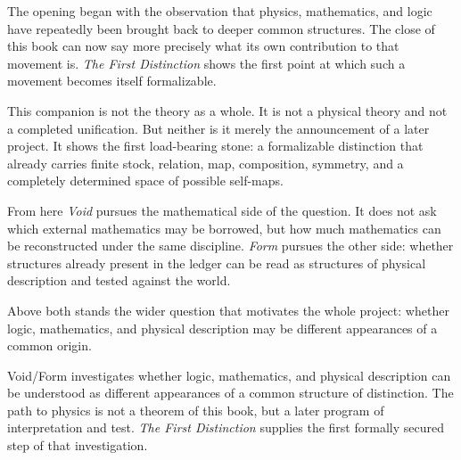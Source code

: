 \documentclass[11pt,a4paper]{book}
\begin{document}
The opening began with the observation that physics, mathematics, and logic
have repeatedly been brought back to deeper common structures. The close of
this book can now say more precisely what its own contribution to that
movement is. \textit{The First Distinction} shows the first point at which
such a movement becomes itself formalizable.

This companion is not the theory as a whole. It is not a physical theory and
not a completed unification. But neither is it merely the announcement of a
later project. It shows the first load-bearing stone: a formalizable
distinction that already carries finite stock, relation, map, composition,
symmetry, and a completely determined space of possible self-maps.

From here \textit{Void} pursues the mathematical side of the question. It
does not ask which external mathematics may be borrowed, but how much
mathematics can be reconstructed under the same discipline. \textit{Form}
pursues the other side: whether structures already present in the ledger can
be read as structures of physical description and tested against the world.

Above both stands the wider question that motivates the whole project:
whether logic, mathematics, and physical description may be different
appearances of a common origin.

\begin{center}
\end{center}

Void/Form investigates whether logic, mathematics, and physical description
can be understood as different appearances of a common structure of
distinction. The path to physics is not a theorem of this book, but a later
program of interpretation and test. \textit{The First Distinction} supplies
the first formally secured step of that investigation.
\end{document}
